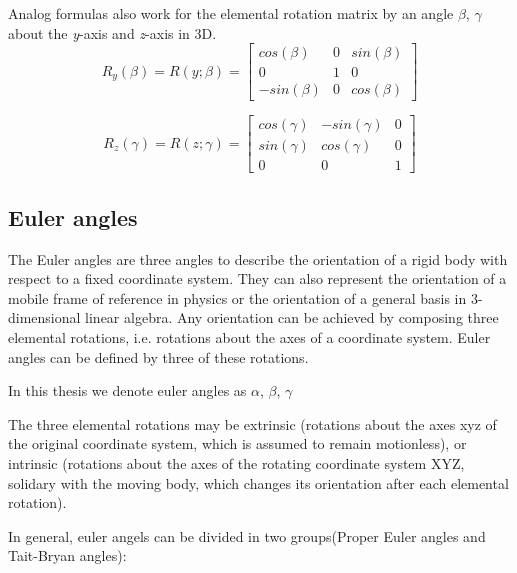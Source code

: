 Analog formulas also work for the elemental rotation matrix by an angle $\beta$, $\gamma$ about the \textit{y}-axis and \textit{z}-axis in 3D.
\begin{equation*}
R_y(\beta) = R(y;\beta)
      = \begin{bmatrix} cos(\beta) & 0 & sin(\beta)\\
                        0 & 1 & 0\\
                        -sin(\beta) & 0 & cos(\beta) \end{bmatrix}                
\end{equation*}
 
\begin{equation*}
R_z(\gamma) = R(z;\gamma)
      = \begin{bmatrix} cos(\gamma) & -sin(\gamma) & 0\\
                        sin(\gamma) & cos(\gamma) & 0\\
                        0 & 0 & 1 \end{bmatrix}                
\end{equation*}

\subsection{Euler angles}
The Euler angles are three angles to describe the orientation of a rigid body with respect to a fixed coordinate system. They can also represent the orientation of a mobile frame of reference in physics or the orientation of a general basis in 3-dimensional linear algebra. Any orientation can be achieved by composing three elemental rotations, i.e. rotations about the axes of a coordinate system. Euler angles can be defined by three of these rotations\cite{wiki_ea}.

In this thesis we denote euler angles as $\alpha$, $\beta$, $\gamma$

The three elemental rotations may be extrinsic (rotations about the axes xyz of the original coordinate system, which is assumed to remain motionless), or intrinsic (rotations about the axes of the rotating coordinate system XYZ, solidary with the moving body, which changes its orientation after each elemental rotation)\cite{wiki_ea}.

In general, euler angels can be divided in two groups(Proper Euler angles and Tait-Bryan angles):

